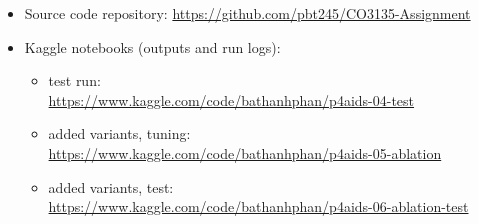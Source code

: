 \begin{itemize}
  \item Source code repository: \url{https://github.com/pbt245/CO3135-Assignment}
  \item Kaggle notebooks (outputs and run logs):
    \begin{itemize}
      \item test run:\\ \url{https://www.kaggle.com/code/bathanhphan/p4aids-04-test}
      \item added variants, tuning:\\ \url{https://www.kaggle.com/code/bathanhphan/p4aids-05-ablation}
      \item added variants, test:\\ \url{https://www.kaggle.com/code/bathanhphan/p4aids-06-ablation-test}
    \end{itemize}
\end{itemize}
